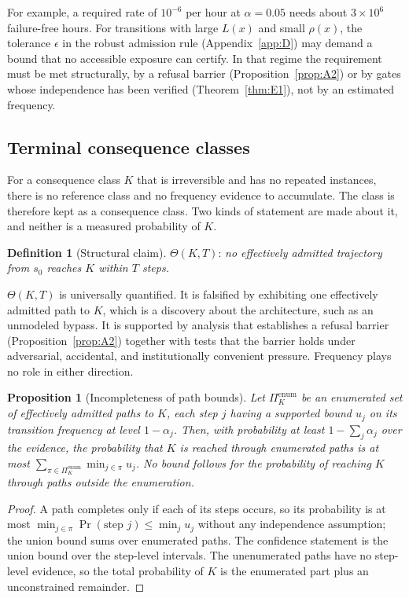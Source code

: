 \documentclass[11pt]{article}
\newtheorem{proposition}[theorem]{Proposition}
\theoremstyle{definition}
\newtheorem{definition}[theorem]{Definition}
\begin{document}
For example, a required rate of $10^{-6}$ per hour at $\alpha=0.05$ needs about $3\times10^{6}$ failure-free hours. For transitions with large $L(x)$ and small $\rho(x)$, the tolerance $\epsilon$ in the robust admission rule (Appendix~\ref{app:D}) may demand a bound that no accessible exposure can certify. In that regime the requirement must be met structurally, by a refusal barrier (Proposition~\ref{prop:A2}) or by gates whose independence has been verified (Theorem~\ref{thm:E1}), not by an estimated frequency.

\subsection{Terminal consequence classes}

For a consequence class $K$ that is irreversible and has no repeated instances, there is no reference class and no frequency evidence to accumulate. The class is therefore kept as a consequence class. Two kinds of statement are made about it, and neither is a measured probability of $K$.

\begin{definition}[Structural claim]
$\Theta(K,T)$: \emph{no effectively admitted trajectory from $s_0$ reaches $K$ within $T$ steps.}
\end{definition}

$\Theta(K,T)$ is universally quantified. It is falsified by exhibiting one effectively admitted path to $K$, which is a discovery about the architecture, such as an unmodeled bypass. It is supported by analysis that establishes a refusal barrier (Proposition~\ref{prop:A2}) together with tests that the barrier holds under adversarial, accidental, and institutionally convenient pressure. Frequency plays no role in either direction.

\begin{proposition}[Incompleteness of path bounds]\label{prop:F3}
Let $\Pi_K^{\mathrm{enum}}$ be an enumerated set of effectively admitted paths to $K$, each step $j$ having a supported bound $u_j$ on its transition frequency at level $1-\alpha_j$. Then, with probability at least $1-\sum_j\alpha_j$ over the evidence, the probability that $K$ is reached \emph{through enumerated paths} is at most $\sum_{\pi\in\Pi_K^{\mathrm{enum}}}\min_{j\in\pi}u_j$. No bound follows for the probability of reaching $K$ through paths outside the enumeration.
\end{proposition}
\begin{proof}
A path completes only if each of its steps occurs, so its probability is at most $\min_{j\in\pi}\Pr(\text{step }j)\le\min_ju_j$ without any independence assumption; the union bound sums over enumerated paths. The confidence statement is the union bound over the step-level intervals. The unenumerated paths have no step-level evidence, so the total probability of $K$ is the enumerated part plus an unconstrained remainder.
\end{proof}
\end{document}
